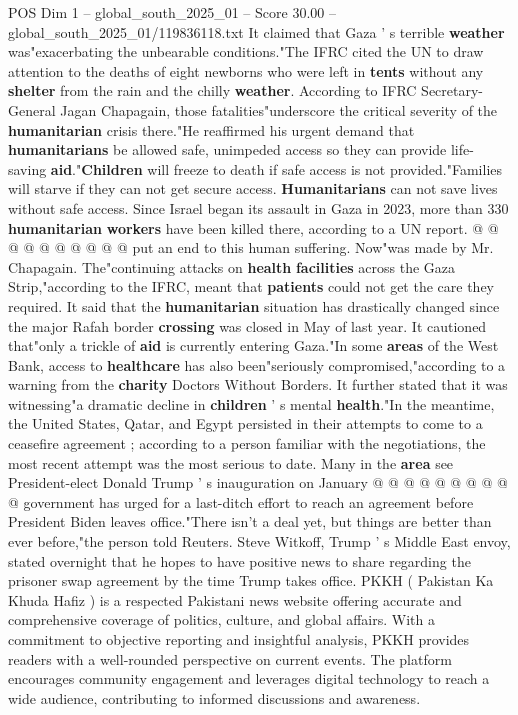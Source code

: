 \begin{textsample}{POS Dim 1 – global\_south\_2025\_01 – Score 30.00 – global\_south\_2025\_01/119836118.txt}
It claimed that Gaza ' s terrible \textbf{weather} was"exacerbating the unbearable conditions."The IFRC cited the UN to draw attention to the deaths of eight newborns who were left in \textbf{tents} without any \textbf{shelter} from the rain and the chilly \textbf{weather}.
According to IFRC Secretary-General Jagan Chapagain, those fatalities"underscore the critical severity of the \textbf{humanitarian} crisis there."He reaffirmed his urgent demand that \textbf{humanitarians} be allowed safe, unimpeded access so they can provide life-saving \textbf{aid}."\textbf{Children} will freeze to death if safe access is not provided."Families will starve if they can not get secure access. \textbf{Humanitarians} can not save lives without safe access.
Since Israel began its assault in Gaza in 2023, more than 330 \textbf{humanitarian} \textbf{workers} have been killed there, according to a UN report. @ @ @ @ @ @ @ @ @ @ put an end to this human suffering.
Now"was made by Mr.
Chapagain.
The"continuing attacks on \textbf{health} \textbf{facilities} across the Gaza Strip,"according to the IFRC, meant that \textbf{patients} could not get the care they required.
It said that the \textbf{humanitarian} situation has drastically changed since the major Rafah border \textbf{crossing} was closed in May of last year.
It cautioned that"only a trickle of \textbf{aid} is currently entering Gaza."In some \textbf{areas} of the West Bank, access to \textbf{healthcare} has also been"seriously compromised,"according to a warning from the \textbf{charity} Doctors Without Borders.
It further stated that it was witnessing"a dramatic decline in \textbf{children} ' s mental \textbf{health}."In the meantime, the United States, Qatar, and Egypt persisted in their attempts to come to a ceasefire agreement ; according to a person familiar with the negotiations, the most recent attempt was the most serious to date.
Many in the \textbf{area} see President-elect Donald Trump ' s inauguration on January @ @ @ @ @ @ @ @ @ @ government has urged for a last-ditch effort to reach an agreement before President Biden leaves office."There isn't a deal yet, but things are better than ever before,"the person told Reuters.
Steve Witkoff, Trump ' s Middle East envoy, stated overnight that he hopes to have positive news to share regarding the prisoner swap agreement by the time Trump takes office.
PKKH ( Pakistan Ka Khuda Hafiz ) is a respected Pakistani news website offering accurate and comprehensive coverage of politics, culture, and global affairs.
With a commitment to objective reporting and insightful analysis, PKKH provides readers with a well-rounded perspective on current events.
The platform encourages community engagement and leverages digital technology to reach a wide audience, contributing to informed discussions and awareness.

\end{textsample}
